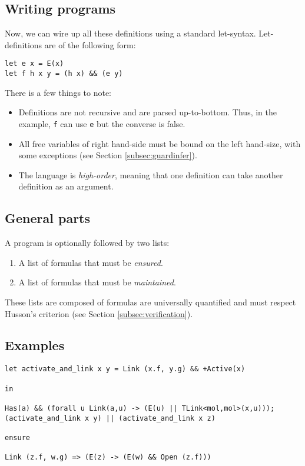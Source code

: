 \documentclass[10pt,a4paper]{article}
\newcommand{\ocaml}{\texttt}
\begin{document}
\subsection{Writing programs}
Now, we can wire up all these definitions using a standard let-syntax. Let-definitions are of the following form:
\begin{verbatim}
let e x = E(x)
let f h x y = (h x) && (e y)
\end{verbatim}
There is a few things to note:
\begin{itemize}
\item Definitions are not recursive and are parsed up-to-bottom. Thus, in the example, \ocaml{f} can use \ocaml{e} but the converse is false.
\item All free variables of right hand-side must be bound on the left hand-size, with some exceptions (see Section \ref{subsec:guardinfer}).
\item The language is \emph{high-order}, meaning that one definition can take another definition as an argument.
\end{itemize}

\subsection{General parts}
A program is optionally followed by two lists:
\begin{enumerate}
\item A list of formulas that must be \emph{ensured}.
\item A list of formulas that must be \emph{maintained}.
\end{enumerate}

These lists are composed of formulas are universally quantified and must respect Husson's criterion (see Section \ref{subsec:verification}).

\subsection{Examples}
\label{configex}
\begin{verbatim}
let activate_and_link x y = Link (x.f, y.g) && +Active(x)

in

Has(a) && (forall u Link(a,u) -> (E(u) || TLink<mol,mol>(x,u)));
(activate_and_link x y) || (activate_and_link x z)

ensure

Link (z.f, w.g) => (E(z) -> (E(w) && Open (z.f)))
\end{verbatim}
\end{document}
